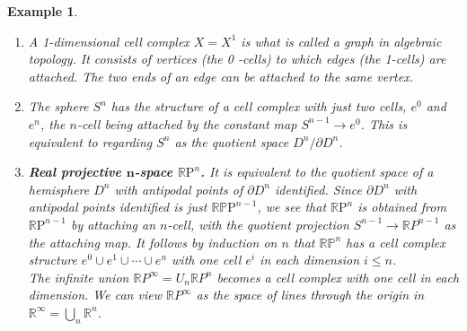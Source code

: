 \documentclass{book}
\newtheorem{example}{Example}
\begin{document}
\begin{example}
    \begin{enumerate}
        \item A 1-dimensional cell complex $X=X^1$ is what is called a graph in algebraic topology. It consists of vertices (the 0 -cells) to which edges (the 1-cells) are attached. The two ends of an edge can be attached to the same vertex.
        \item The sphere $S^n$ has the structure of a cell complex with just two cells, $e^0$ and $e^n$, the $n$-cell being attached by the constant map $S^{n-1} \rightarrow e^0$. This is equivalent to regarding $S^n$ as the quotient space $D^n / \partial D^n$.
        \item \textbf{Real projective $\boldsymbol{n}$-space $\mathbb{R} \mathrm{P}^n$.} It is equivalent to the quotient space of a hemisphere $D^n$ with antipodal points of $\partial D^n$ identified. Since $\partial D^n$ with antipodal points identified is just $\mathbb{R P} \mathrm{P}^{n-1}$, we see that $\mathbb{R} \mathrm{P}^n$ is obtained from $\mathbb{R} \mathrm{P}^{n-1}$ by attaching an $n$-cell, with the quotient projection $S^{n-1} \rightarrow \mathbb{R} P^{n-1}$ as the attaching map. It follows by induction on $n$ that $\mathbb{R P}^n$ has a cell complex structure $e^0 \cup e^1 \cup \cdots \cup e^n$ with one cell $e^i$ in each dimension $i \leq n$.\\
        The infinite union $\mathbb{R} P^{\infty}=U_n \mathbb{R} P^n$ becomes a cell complex with one cell in each dimension. We can view $\mathbb{R} P^{\infty}$ as the space of lines through the origin in $\mathbb{R}^{\infty}=\bigcup_n \mathbb{R}^n$.
        

\end{enumerate}
\end{example}
\end{document}
